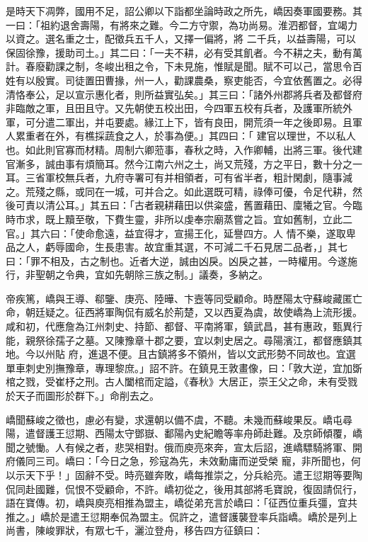 \begin{pinyinscope}
 是時天下凋弊，國用不足，詔公卿以下詣都坐論時政之所先，嶠因奏軍國要務。其一曰：「祖約退舍壽陽，有將來之難。今二方守禦，為功尚易。淮泗都督，宜竭力以資之。選名重之士，配徵兵五千人，又擇一偏將，將
 二千兵，以益壽陽，可以保固徐豫，援助司土。」其二曰：「一夫不耕，必有受其飢者。今不耕之夫，動有萬計。春廢勸課之制，冬峻出租之令，下未見施，惟賦是聞。賦不可以己，當思令百姓有以殷實。司徒置田曹掾，州一人，勸課農桑，察吏能否，今宜依舊置之。必得清恪奉公，足以宣示惠化者，則所益實弘矣。」其三曰：「諸外州郡將兵者及都督府非臨敵之軍，且田且守。又先朝使五校出田，今四軍五校有兵者，及護軍所統外軍，可分遣二軍出，并屯要處。緣江上下，皆有良田，開荒須一年之後即易。且軍人累重者在外，有樵採蔬食之人，於事為便。」其四曰：「
 建官以理世，不以私人也。如此則官寡而材精。周制六卿蒞事，春秋之時，入作卿輔，出將三軍。後代建官漸多，誠由事有煩簡耳。然今江南六州之土，尚又荒殘，方之平日，數十分之一耳。三省軍校無兵者，九府寺署可有并相領者，可有省半者，粗計閑劇，隨事減之。荒殘之縣，或同在一城，可并合之。如此選既可精，祿俸可優，令足代耕，然後可責以清公耳。」其五曰：「古者親耕藉田以供粢盛，舊置藉田、廩犧之官。今臨時市求，既上黷至敬，下費生靈，非所以虔奉宗廟蒸嘗之旨。宜如舊制，立此二官。」其六曰：「使命愈遠，益宜得才，宣揚王化，延譽四方。人
 情不樂，遂取卑品之人，虧辱國命，生長患害。故宜重其選，不可減二千石見居二品者，」其七曰：「罪不相及，古之制也。近者大逆，誠由凶戾。凶戾之甚，一時權用。今遂施行，非聖朝之令典，宜如先朝除三族之制。」議奏，多納之。



 帝疾篤，嶠與王導、郗鑒、庚亮、陸曄、卞壼等同受顧命。時歷陽太守蘇峻藏匿亡命，朝廷疑之。征西將軍陶侃有威名於荊楚，又以西夏為虞，故使嶠為上流形援。咸和初，代應詹為江州刺史、持節、都督、平南將軍，鎮武昌，甚有惠政，甄異行能，親祭徐孺子之墓。又陳豫章十郡之要，宜以刺史居之。尋陽濱江，都督應鎮其地。今以州貼
 府，進退不便。且古鎮將多不領州，皆以文武形勢不同故也。宜選單車刺史別撫豫章，專理黎庶。」詔不許。在鎮見王敦畫像，曰：「敦大逆，宜加斲棺之戮，受崔杼之刑。古人闔棺而定謚，《春秋》大居正，崇王父之命，未有受戮於天子而圖形於群下。」命削去之。



 嶠聞蘇峻之徵也，慮必有變，求還朝以備不虞，不聽。未幾而蘇峻果反。嶠屯尋陽，遣督護王愆期、西陽太守鄧嶽、鄱陽內史紀瞻等率舟師赴難。及京師傾覆，嶠聞之號慟。人有候之者，悲哭相對。俄而庾亮來奔，宣太后詔，進嶠驃騎將軍、開府儀同三司。嶠曰：「今日之急，殄寇為先，未效勳庸而逆受榮
 寵，非所聞也，何以示天下乎！」固辭不受。時亮雖奔敗，嶠每推崇之，分兵給亮。遣王愆期等要陶侃同赴國難，侃恨不受顧命，不許。嶠初從之，後用其部將毛寶說，復固請侃行，語在寶傳。初，嶠與庾亮相推為盟主，嶠從弟充言於嶠曰：「征西位重兵彊，宜共推之。」嶠於是遣王愆期奉侃為盟主。侃許之，遣督護襲登率兵詣嶠。嶠於是列上尚書，陳峻罪狀，有眾七千，灑泣登舟，移告四方征鎮曰：




\end{pinyinscope}
